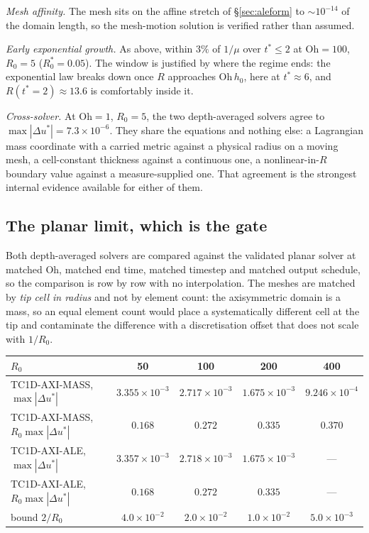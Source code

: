 \documentclass[11pt,a4paper]{article}
\newcommand{\MASS}{\textsf{TC1D-AXI-MASS}}
\newcommand{\ALE}{\textsf{TC1D-AXI-ALE}}
\newcommand{\Oh}{\mathrm{Oh}}
\begin{document}
\emph{Mesh affinity.} The mesh sits on the affine stretch of
\S\ref{sec:aleform} to $\sim10^{-14}$ of the domain length, so the mesh-motion
solution is verified rather than assumed.

\emph{Early exponential growth.} As above, within $3\%$ of $1/\mu$ over
$t^{*}\le2$ at $\Oh=100$, $R_{0}=5$ ($R_{0}^{*}=0.05$). The window is
justified by where the regime ends: the exponential law breaks down once $R$
approaches $\Oh\,h_{0}$, here at $t^{*}\approx6$, and $R(t^{*}=2)\approx13.6$
is comfortably inside it.

\emph{Cross-solver.} At $\Oh=1$, $R_{0}=5$, the two depth-averaged solvers
agree to $\max|\Delta u^{*}| = 7.3\times10^{-6}$. They share the equations and
nothing else: a Lagrangian mass coordinate with a carried metric against a
physical radius on a moving mesh, a cell-constant thickness against a continuous
one, a nonlinear-in-$R$ boundary value against a measure-supplied one. That
agreement is the strongest internal evidence available for either of them.

\subsection{The planar limit, which is the gate}
\label{sec:planarlimit}

Both depth-averaged solvers are compared against the validated planar solver at
matched $\Oh$, matched end time, matched timestep and matched output
schedule, so the comparison is row by row with no interpolation. The meshes are
matched by \emph{tip cell in radius} and not by element count: the axisymmetric
domain is a mass, so an equal element count would place a systematically
different cell at the tip and contaminate the difference with a discretisation
offset that does not scale with $1/R_{0}$.

\begin{center}
\small
\begin{tabular}{@{}lcccc@{}}
\toprule
$R_{0}$ & 50 & 100 & 200 & 400 \\
\midrule
\MASS, $\max|\Delta u^{*}|$ & $3.355\times10^{-3}$ & $2.717\times10^{-3}$
  & $1.675\times10^{-3}$ & $9.246\times10^{-4}$ \\
\MASS, $R_{0}\max|\Delta u^{*}|$ & $0.168$ & $0.272$ & $0.335$ & $0.370$ \\
\ALE,\ $\max|\Delta u^{*}|$ & $3.357\times10^{-3}$ & $2.718\times10^{-3}$
  & $1.675\times10^{-3}$ & --- \\
\ALE,\ $R_{0}\max|\Delta u^{*}|$ & $0.168$ & $0.272$ & $0.335$ & --- \\
bound $2/R_{0}$ & $4.0\times10^{-2}$ & $2.0\times10^{-2}$
  & $1.0\times10^{-2}$ & $5.0\times10^{-3}$ \\
\bottomrule
\end{tabular}
\end{center}
\end{document}

